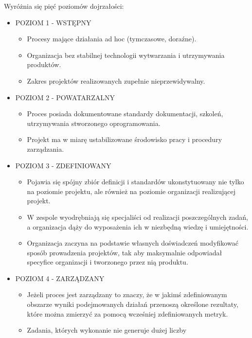 \documentclass[a4paper]{article}
\begin{document}
    Wyróżnia się pięć poziomów dojrzałości:
    \begin{itemize}
        \item POZIOM 1 - WSTĘPNY
        \begin{itemize}
            \item Procesy mające działania ad hoc (tymczasowe, doraźne).
            \item Organizacja bez stabilnej technologii wytwarzania i utrzymywania produktów.
            \item Zakres projektów realizowanych zupełnie nieprzewidywalny.
        \end{itemize}
        \item POZIOM 2 - POWATARZALNY
        \begin{itemize}
            \item Proces posiada dokumentowane standardy dokumentacji, szkoleń, utrzymywania stworzonego oprogramowania.
            \item Projekt ma w miarę ustabilizowane środowisko pracy i procedury zarządzania.
        \end{itemize}
        \item POZIOM 3 - ZDEFINIOWANY
        \begin{itemize}
            \item Pojawia się spójny zbiór definicji i standardów ukonstytuowany
            nie tylko na poziomie projektu, ale również na poziomie
            organizacji realizującej projekt.
            \item W zespole wyodrębniają się specjaliści od realizacji
            poszczególnych zadań, a organizacja dąży do wyposażenia ich
            w niezbędną wiedzę i umiejętności.
            \item Organizacja zaczyna na podstawie własnych doświadczeń
            modyfikować sposób prowadzenia projektów, tak aby
            maksymalnie odpowiadał specyfice organizacji i tworzonego
            przez nią produktu.
        \end{itemize}
        \item POZIOM 4 - ZARZĄDZANY
        \begin{itemize}
            \item Jeżeli proces jest zarządzany to znaczy, że w jakimś
zdefiniowanym obszarze wyniki podejmowanych działań
przenoszą określone rezultaty, które można zmierzyć za
pomocą wcześniej zdefiniowanych metryk.
            \item Zadania, których wykonanie nie generuje dużej liczby

\end{itemize}
\end{itemize}
\end{document}
